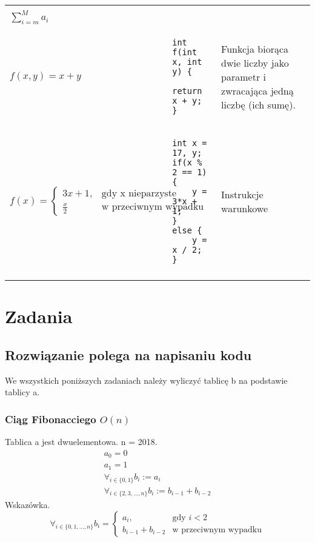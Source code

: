 \documentclass{article}
\begin{document}
\begin{tabular}{ | l | l | m{3cm} | }
& \\
$\sum_{ i = m }^{M} a_i $ & & \\
\hline
$f(x, y) = x + y$ & 
\begin{lstlisting}
int f(int x, int y) {
	return x + y;
} 
\end{lstlisting}
& Funkcja biorąca dwie liczby jako parametr i zwracająca jedną liczbę (ich sumę). \\
\hline
$
f(x) = 
\begin{cases} 
3x + 1, & \text{gdy x nieparzyste} \\
\frac{x}{2} & \text{w przeciwnym wypadku}
\end{cases}
$
&
\begin{lstlisting}
int x = 17, y;
if(x % 2 == 1) {
	y = 3*x + 1;
}
else {
	y = x / 2;
}
\end{lstlisting}
& Instrukcje warunkowe \\
&
& \\
\hline
\end{tabular}

\section{Zadania}
\subsection{Rozwiązanie polega na napisaniu kodu}
We wszystkich poniższych zadaniach należy wyliczyć tablicę b na podstawie tablicy a.
\subsubsection{Ciąg Fibonacciego $O(n)$}
Tablica a jest dwuelementowa. n = 2018.
\begin{gather*}
a_0 = 0 \\
a_1 = 1 \\
\forall_{i \in \{ 0, 1 \} } b_i := a_i \\
\forall_{i \in \{2, 3, \dots, n\} } b_i := b_{i-1} + b_{i-2}
\end{gather*}
Wskazówka.
\begin{displaymath}
\forall_{i \in \{0, 1, \dots, n\} } b_{i} = 
\begin{cases} 
a_i, & \text{gdy $i < 2$} \\
b_{i-1} + b_{i -2} & \text{w przeciwnym wypadku}
\end{cases}
\end{displaymath}
\end{document}

